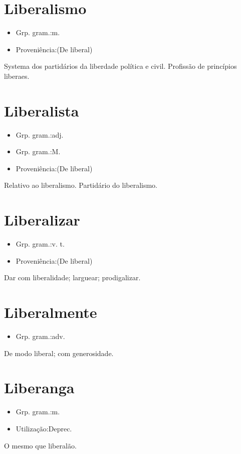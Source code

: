 \section{Liberalismo}
\begin{itemize}
\item {Grp. gram.:m.}
\end{itemize}
\begin{itemize}
\item {Proveniência:(De \textunderscore liberal\textunderscore )}
\end{itemize}
Systema dos partidários da liberdade política e civil.
Profissão de princípios liberaes.
\section{Liberalista}
\begin{itemize}
\item {Grp. gram.:adj.}
\end{itemize}
\begin{itemize}
\item {Grp. gram.:M.}
\end{itemize}
\begin{itemize}
\item {Proveniência:(De \textunderscore liberal\textunderscore )}
\end{itemize}
Relativo ao liberalismo.
Partidário do liberalismo.
\section{Liberalizar}
\begin{itemize}
\item {Grp. gram.:v. t.}
\end{itemize}
\begin{itemize}
\item {Proveniência:(De \textunderscore liberal\textunderscore )}
\end{itemize}
Dar com liberalidade; larguear; prodigalizar.
\section{Liberalmente}
\begin{itemize}
\item {Grp. gram.:adv.}
\end{itemize}
De modo liberal; com generosidade.
\section{Liberanga}
\begin{itemize}
\item {Grp. gram.:m.}
\end{itemize}
\begin{itemize}
\item {Utilização:Deprec.}
\end{itemize}
O mesmo que \textunderscore liberalão\textunderscore .
